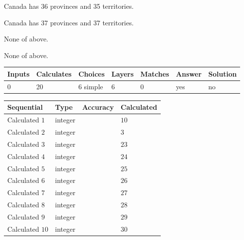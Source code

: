 \documentclass[12pt]{article}
\begin{document}
 
Canada has  %
36 provinces and  %
35 territories.
 
 
Canada has  %
37 provinces and  %
37 territories.
 
 
 None of above.
 
 
\noindent{}
 
 
 None of above.
 
 
\noindent{}
 
 
   
   
   
   
\noindent\begin{tabular}{|l|l|l|l|l|l|l|}
 \hline
Inputs & Calculates & Choices & Layers & Matches & Answer & Solution \\ \hline
           0 & 
          20 & 
           6
  simple  
  & 
           6 & 
           0 & 
  yes & 
  no 
  \\ \hline
 \end{tabular}
   
   
   
   
\noindent{}
   
   
  
  
\noindent\begin{tabular}{|l|l|l|l|}
\hline
 Sequential & Type & Accuracy & Calculated \\ 
\hline
 
 
  Calculated $           1$ & integer &  & 
  $ 10 $ 
 \\  \hline  
 
 
  Calculated $           2$ & integer &  & 
  $ 3 $ 
 \\  \hline  
 
 
  Calculated $           3$ & integer &  & 
  $ 23 $ 
 \\  \hline  
 
 
  Calculated $           4$ & integer &  & 
  $ 24 $ 
 \\  \hline  
 
 
  Calculated $           5$ & integer &  & 
  $ 25 $ 
 \\  \hline  
 
 
  Calculated $           6$ & integer &  & 
  $ 26 $ 
 \\  \hline  
 
 
  Calculated $           7$ & integer &  & 
  $ 27 $ 
 \\  \hline  
 
 
  Calculated $           8$ & integer &  & 
  $ 28 $ 
 \\  \hline  
 
 
  Calculated $           9$ & integer &  & 
  $ 29 $ 
 \\  \hline  
 
 
  Calculated $          10$ & integer &  & 
  $ 30 $ 
 \\  \hline  
 \end{tabular}
   
\end{document}
